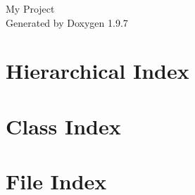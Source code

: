 \documentclass[twoside]{book}
\newcommand{\+}{\discretionary{\mbox{\scriptsize$\hookleftarrow$}}{}{}}
\newcommand{\clearemptydoublepage}{%
    \newpage{\pagestyle{empty}\cleardoublepage}%
  }
\begin{document}
  \raggedbottom
    \hypersetup{pageanchor=false,
                bookmarksnumbered=true,
                pdfencoding=unicode
               }
  \begin{titlepage}
  \vspace*{7cm}
  \begin{center}%
  {\Large My Project}\\
  \vspace*{1cm}
  {\large Generated by Doxygen 1.9.7}\\
  \end{center}
  \end{titlepage}
  \clearemptydoublepage
  \tableofcontents
  \clearemptydoublepage
  \hypersetup{pageanchor=true}
\chapter{Hierarchical Index}

\chapter{Class Index}

\chapter{File Index}

\end{document}
